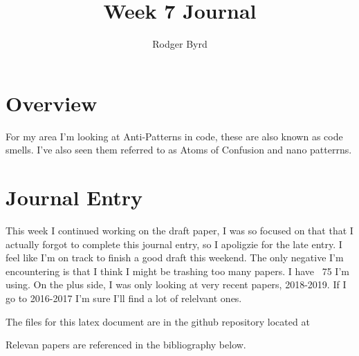 \documentclass[conference]{IEEEtran}
\begin{document}

\title{Week 7 Journal}
\author{Rodger Byrd}
\maketitle


\section{Overview}
For my area I'm looking at Anti-Patterns in code, these are also known as code smells. I've also seen them referred to as Atoms of Confusion and nano patterrns.

\section{Journal Entry}
This week I continued working on the draft paper, I was so focused on that that I actually forgot to complete this journal entry, so I apoligzie for the late entry. I feel like I'm on track to finish a good draft this weekend. The only negative I'm encountering is that I think I might be trashing too many papers. I have ~75 I'm using. On the plus side, I was only looking at very recent papers, 2018-2019.
If I go to 2016-2017 I'm sure I'll find a lot of relelvant ones.

The files for this latex document are in the github repository located at 

Relevan papers are referenced in the bibliography below. 
\nocite{*}
\clearpage




\end{document}

